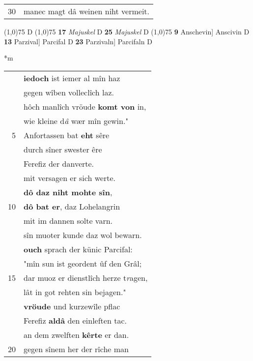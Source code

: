 \documentclass[8pt,a4paper,notitlepage]{article}
\begin{document}
\begin{table}[ht]
\begin{minipage}[t]{0.5\linewidth}
\begin{tabular}{rl}
30 & manec magt dâ weinen niht vermeit.\\ 
\end{tabular}
\scriptsize
\line(1,0){75} \newline
D \newline
\line(1,0){75} \newline
\textbf{17} \textit{Majuskel} D  \textbf{25} \textit{Majuskel} D  \newline
\line(1,0){75} \newline
\textbf{9} Anschevin] Anscivin D \textbf{13} Parzival] Parcifal D \textbf{23} Parzivaln] Parcifaln D \newline
\end{minipage}
\hspace{0.5cm}
\begin{minipage}[t]{0.5\linewidth}
\small
\begin{center}*m
\end{center}
\begin{tabular}{rl}
 & \textbf{iedoch} ist iemer al mîn haz\\ 
 & gegen wîben volleclîch laz.\\ 
 & hôch manlîch vröude \textbf{komt von} in,\\ 
 & wie kleine d\textit{â} wær mîn gewin."\\ 
5 & Anfortassen bat \textbf{eht} sêre\\ 
 & durch sîner swester êre\\ 
 & Ferefiz der danverte.\\ 
 & mit versagen er sich werte.\\ 
 & \textbf{dô daz niht mohte sîn},\\ 
10 & \textbf{dô bat er}, daz Lohelangrin\\ 
 & mit im dannen solte varn.\\ 
 & sîn muoter kunde daz wol bewarn.\\ 
 & \textbf{ouch} sprach der künic Parcifal:\\ 
 & "mîn sun ist geordent ûf den Grâl;\\ 
15 & dar muoz er dienstlîch herze t\textit{r}agen,\\ 
 & lât in got rehten sin bejagen."\\ 
 & \textbf{vröude} und kurzewîle pflac\\ 
 & Ferefiz \textbf{aldâ} den einleften tac.\\ 
 & an dem zwelften \textbf{kêrte} er dan.\\ 
20 & gegen sînem her der rîche man\\ 

\end{tabular}
\end{minipage}
\end{table}
\end{document}
